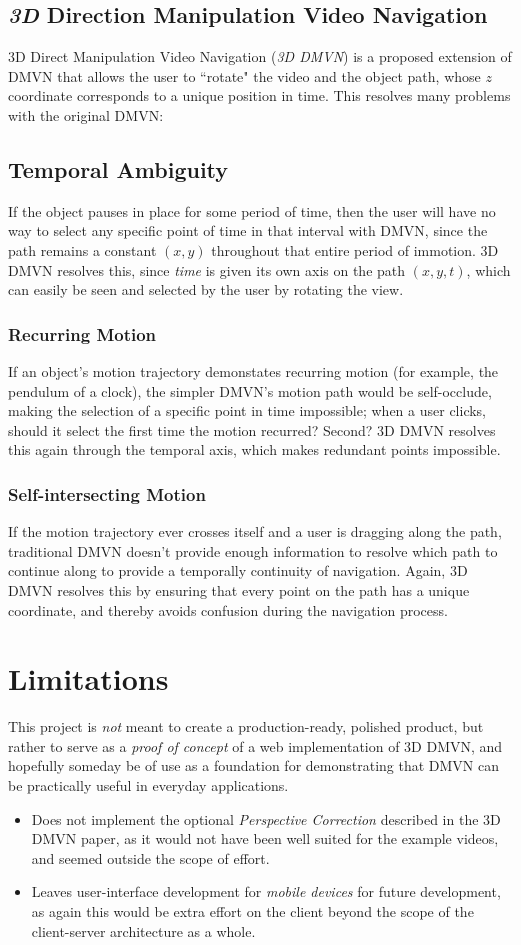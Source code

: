 \subsection{\emph{3D} Direction Manipulation Video Navigation}
3D Direct Manipulation Video Navigation (\emph{3D DMVN}) is a proposed extension of DMVN that allows the user to ``rotate" the video and the object path, whose $z$ coordinate corresponds to a unique position in time. This resolves many problems with the original DMVN:
\subsection {Temporal Ambiguity}
    If the object pauses in place for some period of time, then the user will have no way to select any specific point of time in that interval with DMVN, since the path remains a constant $(x,y)$ throughout that entire period of immotion. 3D DMVN resolves this, since \emph{time} is given its own axis on the path $(x,y,t)$, which can easily be seen and selected by the user by rotating the view.
\subsubsection{Recurring Motion}
    If an object's motion trajectory demonstates recurring motion (for example, the pendulum of a clock), the simpler DMVN's motion path would be self-occlude, making the selection of a specific point in time impossible; when a user clicks, should it select the first time the motion recurred? Second? 3D DMVN resolves this again through the temporal axis, which makes redundant points impossible.
\subsubsection{Self-intersecting Motion}
    If the motion trajectory ever crosses itself and a user is dragging along the path, traditional DMVN doesn't provide enough information to resolve which path to continue along to provide a temporally continuity of navigation. Again, 3D DMVN resolves this by ensuring that every point on the path has a unique coordinate, and thereby avoids confusion during the navigation process.
\section{Limitations}
This project is \emph{not} meant to create a production-ready, polished product, but rather to serve as a \emph{proof of concept} of a web implementation of 3D DMVN, and hopefully someday be of use as a foundation for demonstrating that DMVN can be practically useful in everyday applications.
\begin{itemize}
    \item Does not implement the optional \emph{Perspective Correction} described in the 3D DMVN paper, as it would not have been well suited for the example videos, and seemed outside the scope of effort.
    \item Leaves user-interface development for \emph{mobile devices} for future development, as again this would be extra effort on the client beyond the scope of the client-server architecture as a whole.
\end{itemize}


